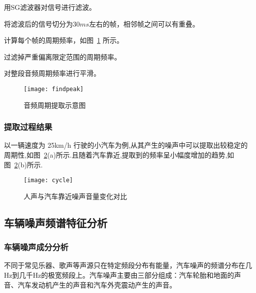 \begin{compactenum}
\item 用SG滤波器对信号进行滤波。

\item 将滤波后的信号切分为$30ms$左右的帧，相邻帧之间可以有重叠。

\item 计算每个帧的周期频率，如图~\ref{fig:findpeak} 所示。

\item 过滤掉严重偏离限定范围的周期频率。

\item 对整段音频周期频率进行平滑。

\end{compactenum}

\begin{figure}[htbp] %
  \centering
  \texttt{[image: findpeak]}
  \caption{音频周期提取示意图}
  \label{fig:findpeak}
\end{figure}



\subsubsection{提取过程结果}

以一辆速度为 25km/h 行驶的小汽车为例,从其产生的噪声中可以提取出较稳定的周期性,如图~\ref{fig:cycle}(a)所示.且随着汽车靠近,提取到的频率呈小幅度增加的趋势,如图~\ref{fig:cycle}(b)所示. 

\begin{figure}[htbp] %
  \centering
  \texttt{[image: cycle]}
  \caption[音量变化特性对比]{人声与汽车靠近噪声音量变化对比}
  \label{fig:cycle}
\end{figure}



\subsection{车辆噪声频谱特征分析}

\subsubsection{车辆噪声成分分析}
不同于常见乐器、歌声等声源只在特定频段分布有能量，汽车噪声的频谱分布在几Hz到几千Hz的极宽频段上。汽车噪声主要由三部分组成：汽车轮胎和地面的声音、汽车发动机产生的声音和汽车外壳震动产生的声音。

